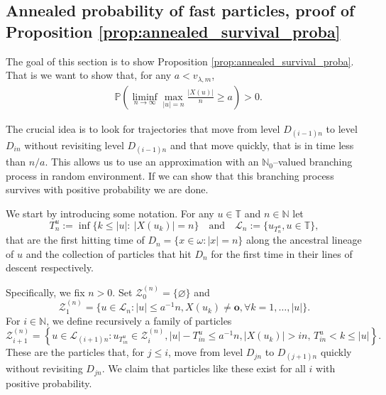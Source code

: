 \documentclass[11 pt]{article}
\theoremstyle{definition}
\numberwithin{equation}{section}
\newcommand{\NN}{\mathbb{N}}
\newcommand{\TT}{\mathbb{T}} %
\newcommand{\PP}{\mathbb{P}} %
\newcommand{\rt}{\mathbf{o}} %
\begin{document}
\subsection{Annealed probability of fast particles, proof of Proposition \ref{prop:annealed_survival_proba}}\label{sec:annealed_survival_proba}

The goal of this section is to show Proposition \ref{prop:annealed_survival_proba}. That is we want to show that, for any $a<v_{\lambda,m}$,
\begin{align*}
		&\PP \left( \liminf_{n\to\infty} \max_{\vert u \vert = n} \frac{\vert X(u) \vert}{n} \ge  a\right) > 0.
\end{align*} 




The crucial idea is to look for trajectories that move from level $D_{(i-1)n}$ to level $D_{in}$ without revisiting level $D_{(i-1)n}$ and that move quickly, that is in time less than $n/a$. This allows us to use an approximation with an $\NN_0$--valued branching process in random environment. If we can show that this branching process survives with positive probability we are done.

We start by introducing some notation. For any $u\in \TT$ and $n\in \NN$ let 
\begin{equation*}
	T^u_n:=\inf \{k\le |u|: ~ |X(u_k)|  = n\} \quad \text{and} \quad \mathcal{L}_n:= \{ u_{T^u_n}, u\in\TT \},
\end{equation*} 
that are the first hitting time of $D_n=\{x\in \omega: \vert x \vert=n\}$ along the ancestral lineage of $u$ and the collection of particles that hit $D_n$ for the first time in their lines of descent respectively. 

Specifically, we fix 
$n>0$. Set $\mathcal{Z}^{(n)}_{0}= \{\varnothing\}$ and 
\begin{equation}\label{eq:Z1}
\mathcal{Z}^{(n)}_{1} = \{u\in  \mathcal{L}_n \colon |u| \le a^{-1} n,X(u_k)\ne \rt, \forall k= 1,\ldots, |u|   \} . 
\end{equation}
For $i\in \NN$, we define recursively a family of particles 
\begin{equation*}
	\mathcal{Z}^{(n)}_{i+1} = \left\{u\in \mathcal{L}_{(i+1)n}: u_{T^u_{i n}}\in \mathcal{Z}^{(n)}_i, |u|- T^u_{i n}\le a^{-1} n,  \vert X(u_k) \vert > in, \, T^u_{in} < k \leq \vert u \vert \right\}.
\end{equation*}
These are the particles that, for $j \leq i$, move from level $D_{jn}$ to $D_{(j+1)n}$ quickly without revisiting $D_{jn}$. 
We claim that particles like these exist for all $i$ with positive probability. 
\end{document}
